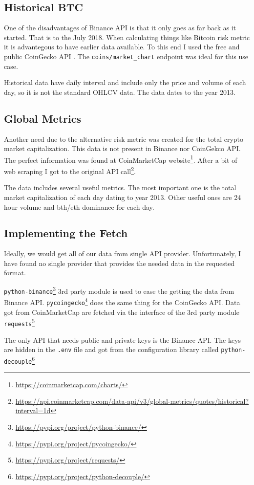 \subsection*{Historical BTC}
One of the disadvantages of Binance API is that it only goes as far back as it started. That is to the July 2018. When calculating things like Bitcoin risk metric it is advantegous to have earlier data available. To this end I used the free and public CoinGecko API \cite{coingecko:documentation}. The \texttt{coins/market\_chart} endpoint was ideal for this use case.

Historical data have daily interval and include only the price and volume of each day, so it is not the standard OHLCV data. The data dates to the year 2013.

\subsection*{Global Metrics}
Another need due to the alternative risk metric was created for the total crypto market capitalization. This data is not present in Binance nor CoinGekco API. The perfect information was found at CoinMarketCap website\footnote{\url{https://coinmarketcap.com/charts/}}. After a bit of web scraping I got to the original API call\footnote{\url{https://api.coinmarketcap.com/data-api/v3/global-metrics/quotes/historical?interval=1d}}.

The data includes several useful metrics. The most important one is the total market capitalization of each day dating to year 2013. Other useful ones are 24 hour volume and bth/eth dominance for each day.

\subsection*{Implementing the Fetch}
Ideally, we would get all of our data from single API provider. Unfortunately, I have found no single provider that provides the needed data in the requested format.

\texttt{python-binance}\footnote{\url{https://pypi.org/project/python-binance/}} 3rd party module is used to ease the getting the data from Binance API. \texttt{pycoingecko}\footnote{\url{https://pypi.org/project/pycoingecko/}} does the same thing for the CoinGecko API. Data got from CoinMarketCap are fetched via the interface of the 3rd party module \texttt{requests}\footnote{\url{https://pypi.org/project/requests/}}

The only API that needs public and private keys is the Binance API. The keys are hidden in the \texttt{.env} file and got from the configuration library called \texttt{python-decouple}\footnote{\url{https://pypi.org/project/python-decouple/}}

